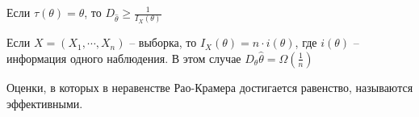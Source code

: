 \documentclass[document.tex]{subfiles}
\begin{document}
\begin{corollary}
    Если $\tau(\theta) = \theta$, то $D_{\hat \theta} \geq \frac{1}{I_X(\theta)}$
\end{corollary}

Если $X = (X_1, \cdots, X_n)$ -- выборка, то $I_X(\theta) = n \cdot i(\theta)$, где $i(\theta)$ -- информация одного
наблюдения. В этом случае $D_{\theta}\hat \theta = \Omega(\frac{1}{n})$

\begin{definition}
    Оценки, в которых в неравенстве Рао-Крамера достигается равенство, называются эффективными.
\end{definition}
\end{document}
